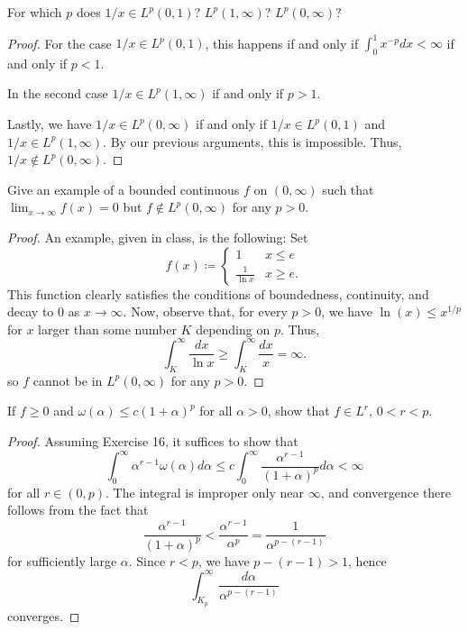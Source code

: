 \begin{problem}
For which $p$ does $1/x\in L^p(0,1)$? $L^p(1,\infty)$? $L^p(0,\infty)$?
\end{problem}
\begin{proof}
For the case $1/x\in L^p(0,1)$, this happens if and only if $\int_0^1
x^{-p}dx<\infty$ if and only if $p<1$.

In the second case $1/x\in L^p(1,\infty)$ if and only if $p>1$.

Lastly, we have $1/x\in L^p(0,\infty)$ if and only if $1/x\in L^p(0,1)$ and
$1/x\in L^p(1,\infty)$. By our previous arguments, this is
impossible. Thus, $1/x\notin L^p(0,\infty)$.
\end{proof}
\newpage

\begin{problem}
Give an example of a bounded continuous $f$ on $(0,\infty)$ such that
$\lim_{x\to\infty}f(x)=0$ but $f\notin L^p(0,\infty)$ for any $p>0$.
\end{problem}
\begin{proof}
An example, given in class, is the following: Set
\begin{equation}
\label{eq:11:example}
f(x)\coloneqq
\begin{cases}
1&x\leq e\\
\frac{1}{\ln x}&x\geq e.
\end{cases}
\end{equation}
This function clearly satisfies the conditions of boundedness, continuity,
and decay to $0$ as $x\to\infty$. Now, observe that, for every $p>0$, we
have $\ln(x)\leq x^{1/p}$ for $x$ larger than some number $K$ depending on
$p$. Thus,
\[
\int_K^\infty\frac{dx}{\ln x}\geq\int_K^\infty\frac{dx}{x}=\infty.
\]
so $f$ cannot be in $L^p(0,\infty)$ for any $p>0$.
\end{proof}
\newpage

\begin{problem}
If $f\geq 0$ and $\omega(\alpha)\leq c(1+\alpha)^p$ for all $\alpha>0$,
show that $f\in L^r$, $0<r<p$.
\end{problem}
\begin{proof}
Assuming Exercise 16, it suffices to show that
\begin{equation}
\label{eq:11:need-to-show}
\int_0^\infty\alpha^{r-1}\omega(\alpha)d\alpha\leq c\int_0^\infty\frac{\alpha^{r-1}}{(1+\alpha)^p}d\alpha<\infty
\end{equation}
for all $r\in(0,p)$. The integral is improper only near $\infty$, and
convergence there follows from the fact that
\[
\frac{\alpha^{r-1}}{(1+\alpha)^p}<\frac{\alpha^{r-1}}{\alpha^p}=\frac{1}{\alpha^{p-(r-1)}}
\]
for sufficiently large $\alpha$. Since $r<p$, we have $p-(r-1)>1$, hence
\[
\int_{K_p}^\infty\frac{d\alpha}{\alpha^{p-(r-1)}}
\]
converges.
\end{proof}

